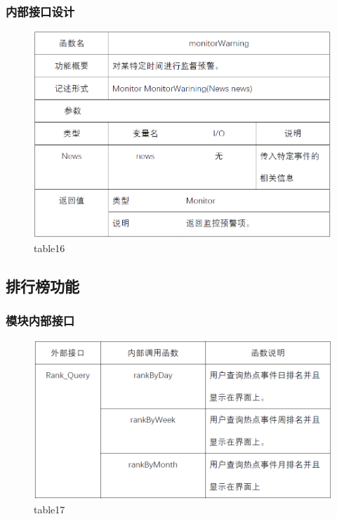 \subsubsection{内部接口设计}
\begin{figure}[!htb]
	\centering
	\includegraphics[scale=1]{image/b16.png} %
	\caption{table16} %
\end{figure}
\subsection{排行榜功能}
\subsubsection{模块内部接口}
\begin{figure}[!htb]
	\centering
	\includegraphics[scale=1]{image/b17.png} %
	\caption{table17} %
\end{figure}

